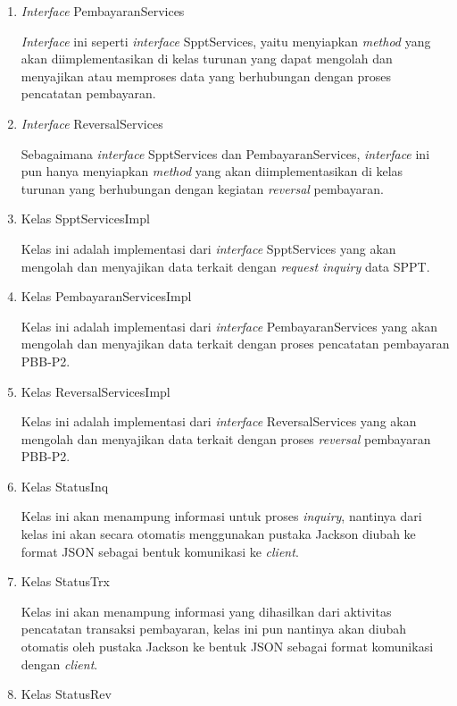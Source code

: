 \documentclass[pdftex,12pt, oneside]{article}
\begin{document}
\begin{enumerate}[1.]
  \item \textit{Interface} PembayaranServices
  
  \textit{Interface} ini seperti \textit{interface} SpptServices, yaitu menyiapkan \textit{method} yang akan diimplementasikan di kelas turunan yang dapat mengolah dan menyajikan atau memproses data yang berhubungan dengan proses pencatatan pembayaran.
  
  \item \textit{Interface} ReversalServices
  
  Sebagaimana \textit{interface} SpptServices dan PembayaranServices, \textit{interface} ini pun hanya menyiapkan \textit{method} yang akan diimplementasikan di kelas turunan yang berhubungan dengan kegiatan \textit{reversal} pembayaran.
  
  \item Kelas SpptServicesImpl
  
  Kelas ini adalah implementasi dari \textit{interface} SpptServices yang akan mengolah dan menyajikan data terkait dengan \textit{request inquiry} data SPPT. 
  
  \item Kelas PembayaranServicesImpl
  
  Kelas ini adalah implementasi dari \textit{interface} PembayaranServices yang akan mengolah dan menyajikan data terkait dengan proses pencatatan pembayaran PBB-P2.
  
  \item Kelas ReversalServicesImpl
  
  Kelas ini adalah implementasi dari \textit{interface} ReversalServices yang akan mengolah dan menyajikan data terkait dengan proses \textit{reversal} pembayaran PBB-P2.
  
  \item Kelas StatusInq
  
  Kelas ini akan menampung informasi untuk proses \textit{inquiry}, nantinya dari kelas ini akan secara otomatis menggunakan pustaka Jackson diubah ke format JSON sebagai bentuk komunikasi ke \textit{client}.
  
  \item Kelas StatusTrx
  
  Kelas ini akan menampung informasi yang dihasilkan dari aktivitas pencatatan transaksi pembayaran, kelas ini pun nantinya akan diubah otomatis oleh pustaka Jackson ke bentuk JSON sebagai format komunikasi dengan \textit{client}.
  
  \item Kelas StatusRev
  

\end{enumerate}
\end{document}
